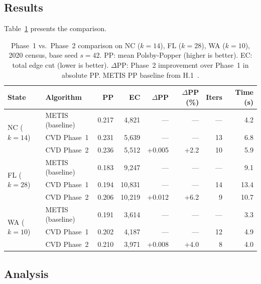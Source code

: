 \subsection{Results}

Table~\ref{tab:main-results} presents the comparison.

\begin{table}[t]
\centering
\caption{%
  Phase~1 vs.\ Phase~2 \cvd{} comparison on NC ($k=14$), FL ($k=28$),
  WA ($k=10$), 2020 census, base seed $s=42$.
  PP: mean Polsby-Popper (higher is better).
  EC: total edge cut (lower is better).
  $\Delta$PP: Phase~2 improvement over Phase~1 in absolute PP.
  METIS PP baseline from H.1~\citep{h1paper}.
}
\label{tab:main-results}
\renewcommand{\arraystretch}{1.3}
\begin{tabular}{@{}llrrrrrr@{}}
\toprule
State & Algorithm & PP & EC & $\Delta$PP & $\Delta$PP (\%) & Iters & Time (s) \\
\midrule
\multirow{3}{*}{NC ($k=14$)}
 & METIS (baseline) & 0.217 & 4{,}821 & ---   & ---   & --- & 4.2 \\
 & CVD Phase~1      & 0.231 & 5{,}639 & ---   & ---   & 13  & 6.8 \\
 & CVD Phase~2      & 0.236 & 5{,}512 & +0.005 & +2.2 & 10  & 5.9 \\
\midrule
\multirow{3}{*}{FL ($k=28$)}
 & METIS (baseline) & 0.183 & 9{,}247 & ---   & ---   & --- & 9.1 \\
 & CVD Phase~1      & 0.194 & 10{,}831 & ---  & ---   & 14  & 13.4 \\
 & CVD Phase~2      & 0.206 & 10{,}219 & +0.012 & +6.2 & 9  & 10.7 \\
\midrule
\multirow{3}{*}{WA ($k=10$)}
 & METIS (baseline) & 0.191 & 3{,}614 & ---   & ---   & --- & 3.3 \\
 & CVD Phase~1      & 0.202 & 4{,}187 & ---   & ---   & 12  & 4.9 \\
 & CVD Phase~2      & 0.210 & 3{,}971 & +0.008 & +4.0 & 8  & 4.0 \\
\bottomrule
\end{tabular}
\end{table}

\subsection{Analysis}

